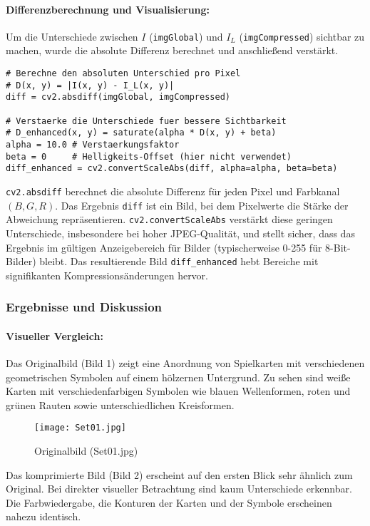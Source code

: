 \documentclass[titlepage]{article}
\begin{document}
\paragraph{Differenzberechnung und Visualisierung:}
Um die Unterschiede zwischen $I$ (\texttt{imgGlobal}) und $I_L$ (\texttt{imgCompressed}) sichtbar zu machen, wurde die absolute Differenz berechnet und anschließend verstärkt.
\begin{lstlisting}[caption={Berechnung und Verstärkung des Differenzbildes}]
# Berechne den absoluten Unterschied pro Pixel
# D(x, y) = |I(x, y) - I_L(x, y)|
diff = cv2.absdiff(imgGlobal, imgCompressed)

# Verstaerke die Unterschiede fuer bessere Sichtbarkeit
# D_enhanced(x, y) = saturate(alpha * D(x, y) + beta)
alpha = 10.0 # Verstaerkungsfaktor
beta = 0     # Helligkeits-Offset (hier nicht verwendet)
diff_enhanced = cv2.convertScaleAbs(diff, alpha=alpha, beta=beta) 
\end{lstlisting}
\texttt{cv2.absdiff} berechnet die absolute Differenz für jeden Pixel und Farbkanal $(B, G, R)$. Das Ergebnis \texttt{diff} ist ein Bild, bei dem Pixelwerte die Stärke der Abweichung repräsentieren. \texttt{cv2.convertScaleAbs} verstärkt diese geringen Unterschiede, insbesondere bei hoher JPEG-Qualität, und stellt sicher, dass das Ergebnis im gültigen Anzeigebereich für Bilder (typischerweise 0-255 für 8-Bit-Bilder) bleibt. Das resultierende Bild \texttt{diff\_enhanced} hebt Bereiche mit signifikanten Kompressionsänderungen hervor.


\subsubsection{Ergebnisse und Diskussion}
\paragraph{Visueller Vergleich:}
Das Originalbild (Bild 1) zeigt eine Anordnung von Spielkarten mit verschiedenen geometrischen Symbolen auf einem hölzernen Untergrund. Zu sehen sind weiße Karten mit verschiedenfarbigen Symbolen wie blauen Wellenformen, roten und grünen Rauten sowie unterschiedlichen Kreisformen.

\begin{figure}[H]
    \centering
    \texttt{[image: Set01.jpg]}
    \caption{Originalbild (Set01.jpg)}
    \label{fig:original}
\end{figure}

Das komprimierte Bild (Bild 2) erscheint auf den ersten Blick sehr ähnlich zum Original. Bei direkter visueller Betrachtung sind kaum Unterschiede erkennbar. Die Farbwiedergabe, die Konturen der Karten und der Symbole erscheinen nahezu identisch.
\end{document}
